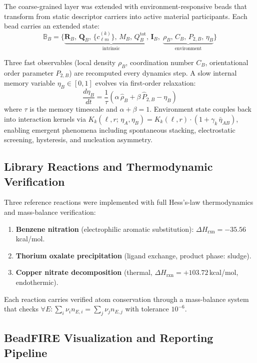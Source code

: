 \documentclass[11pt]{article}
\newcommand{\boldI}{\mathbf{I}}
\begin{document}
The coarse-grained layer was extended with environment-responsive
beads that transform from static descriptor carriers into active
material participants.  Each bead carries an extended state:
\[
\mathbb{B}_B = \bigl\{
  \underbrace{\mathbf{R}_B,\,\mathbf{Q}_B,\,\{c_{\ell m}^{(k)}\},\,M_B,\,Q_B^{\mathrm{tot}},\,\boldI_B}_{\text{intrinsic}},\;
  \underbrace{\rho_B,\,C_B,\,P_{2,B},\,\eta_B}_{\text{environment}}
\bigr\}
\]

Three fast observables (local density $\rho_B$, coordination number
$C_B$, orientational order parameter $P_{2,B}$) are recomputed every
dynamics step.  A slow internal memory variable $\eta_B \in [0,1]$
evolves via first-order relaxation:
\[
\frac{d\eta_B}{dt} = \frac{1}{\tau}\left(
  \alpha\,\hat{\rho}_B + \beta\,\hat{P}_{2,B} - \eta_B
\right)
\]
where $\tau$ is the memory timescale and $\alpha + \beta = 1$.
Environment state couples back into interaction kernels via
$K_k(\ell, r;\,\eta_A, \eta_B) = K_k(\ell, r) \cdot
(1 + \gamma_k\,\bar{\eta}_{AB})$, enabling emergent phenomena
including spontaneous stacking, electrostatic screening, hysteresis,
and nucleation asymmetry.

\subsection{Library Reactions and Thermodynamic Verification}

Three reference reactions were implemented with full Hess's-law
thermodynamics and mass-balance verification:
\begin{enumerate}
\item \textbf{Benzene nitration} (electrophilic aromatic substitution):
      $\Delta H_{\mathrm{rxn}} = -35.56$\,kcal/mol.
\item \textbf{Thorium oxalate precipitation} (ligand exchange,
      product phase: sludge).
\item \textbf{Copper nitrate decomposition} (thermal,
      $\Delta H_{\mathrm{rxn}} = +103.72$\,kcal/mol, endothermic).
\end{enumerate}
Each reaction carries verified atom conservation through a
mass-balance system that checks
$\forall E: \sum_i \nu_i n_{E,i} = \sum_j \nu_j n_{E,j}$
with tolerance $10^{-6}$.

\subsection{BeadFIRE Visualization and Reporting Pipeline}
\end{document}
